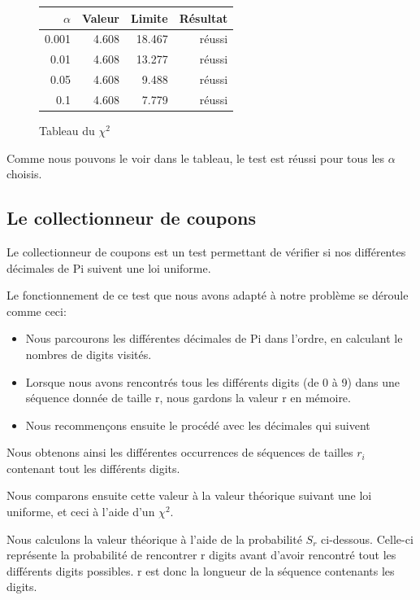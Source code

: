 \documentclass[10pt,a4paper]{article}
\begin{document}
	\begin{figure}[h]
		\centering
		\begin{tabular}{|r|r|r|r|}
			\hline
			$\alpha$ & Valeur & Limite & Résultat\\
			\hline
			0.001 & 4.608 & 18.467 & réussi\\
			0.01 & 4.608 & 13.277 & réussi\\
			0.05 & 4.608 & 9.488 & réussi\\
			0.1 & 4.608 & 7.779 & réussi\\
			\hline
		\end{tabular}
		\caption{Tableau du $\chi^2$}
	\end{figure}
	
	Comme nous pouvons le voir dans le tableau, le test est réussi pour tous les $\alpha$ choisis.	
		
\newpage
	
\subsection{Le collectionneur de coupons}
Le collectionneur de coupons est un test permettant de vérifier si nos différentes décimales de Pi suivent une loi uniforme.
 
Le fonctionnement de ce test que nous avons adapté à notre problème se déroule comme ceci:  
\begin{itemize}
\item Nous parcourons les différentes décimales de Pi dans l'ordre, en calculant le nombres de digits visités.
\item Lorsque nous avons rencontrés tous les différents digits (de 0 à 9) dans une séquence donnée de taille r, nous gardons la valeur r en mémoire.
\item Nous recommençons ensuite le procédé avec les décimales qui suivent 
\end{itemize}

Nous obtenons ainsi les différentes occurrences de séquences de tailles $r_i$ contenant tout les différents digits.

Nous comparons ensuite cette valeur à la valeur théorique suivant une loi uniforme, et ceci à l'aide d'un $\chi^2$.

Nous calculons la valeur théorique à l'aide de la probabilité $ S_r$ ci-dessous. Celle-ci représente la probabilité de rencontrer r digits avant d'avoir rencontré tout les différents digits possibles. r est donc la longueur de la séquence contenants les digits.
\end{document}
